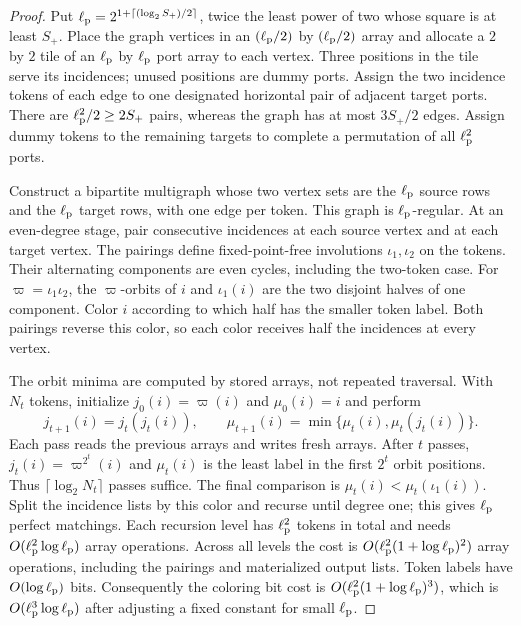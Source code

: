 \begin{proof}
Put $\ell_{\rm p}=2^{1+\lceil(\log_2S_+)/2\rceil}$, twice the least power of two whose square is at least $S_+$.
Place the graph vertices in an $(\ell_{\rm p}/2)$ by $(\ell_{\rm p}/2)$ array and allocate a $2$ by
$2$ tile of an $\ell_{\rm p}$ by $\ell_{\rm p}$ port array to each vertex. Three positions in
the tile serve its incidences; unused positions are dummy ports. Assign
the two incidence tokens of each edge to one designated horizontal
pair of adjacent target ports. There are $\ell_{\rm p}^2/2\ge2S_+$ pairs, whereas
the graph has at most $3S_+/2$ edges. Assign dummy tokens to the remaining
targets to complete a permutation of all $\ell_{\rm p}^2$ ports.

Construct a bipartite multigraph whose two vertex sets are the $\ell_{\rm p}$
source rows and the $\ell_{\rm p}$ target rows, with one edge per token. This graph
is $\ell_{\rm p}$-regular. At an even-degree stage, pair consecutive incidences at
each source vertex and at each target vertex. The pairings define
fixed-point-free involutions $\iota_1,\iota_2$ on the tokens. Their alternating
components are even cycles, including the two-token case. For $\varpi=\iota_1\iota_2$,
the $\varpi$-orbits of $i$ and $\iota_1(i)$ are the two disjoint halves of one
component. Color $i$ according to which half has the smaller token label.
Both pairings reverse this color, so each color receives half the
incidences at every vertex.

The orbit minima are computed by stored arrays, not repeated traversal.
With $N_t$ tokens, initialize $j_0(i)=\varpi(i)$ and $\mu_0(i)=i$ and perform
\[
 j_{t+1}(i)=j_t(j_t(i)),\qquad
 \mu_{t+1}(i)=\min\{\mu_t(i),\mu_t(j_t(i))\}.
\]
Each pass reads the previous arrays and writes fresh arrays. After $t$
passes, $j_t(i)=\varpi^{2^t}(i)$ and $\mu_t(i)$ is the least label in the first
$2^t$ orbit positions. Thus $\lceil\log_2 N_t\rceil$ passes suffice.
The final comparison is $\mu_t(i)<\mu_t(\iota_1(i))$. Split the incidence lists
by this color and recurse until degree one; this gives $\ell_{\rm p}$ perfect
matchings. Each recursion level has $\ell_{\rm p}^2$ tokens in total and needs
$O(\ell_{\rm p}^2\log\ell_{\rm p})$ array operations. Across all levels the cost is
$O(\ell_{\rm p}^2(1+\log\ell_{\rm p})^2)$ array operations, including the pairings and
materialized output lists. Token labels have $O(\log\ell_{\rm p})$ bits.
Consequently the coloring bit cost is $O(\ell_{\rm p}^2(1+\log\ell_{\rm p})^3)$, which is
$O(\ell_{\rm p}^3\log\ell_{\rm p})$ after adjusting a fixed constant for small $\ell_{\rm p}$.


\end{proof}
